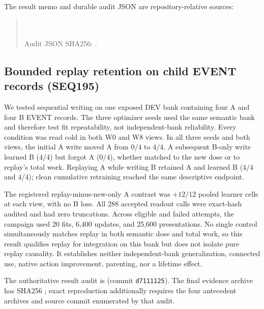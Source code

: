 \documentclass{article}
\begin{document}
The result memo and durable audit JSON are repository-relative sources:
\begin{quote}\small
{}\\
\\
Audit JSON SHA256:
.
\end{quote}

\subsection{Bounded replay retention on child EVENT records (SEQ195)}

We tested sequential writing on one exposed DEV bank containing four A and
four B EVENT records. The three optimizer seeds used the same semantic bank
and therefore test fit repeatability, not independent-bank reliability. Every
condition was read cold in both W0 and W8 views. In all three seeds and both
views, the initial A write moved A from $0/4$ to $4/4$. A subsequent B-only
write learned B ($4/4$) but forgot A ($0/4$), whether matched to the new dose
or to replay's total work. Replaying A while writing B retained A and learned
B ($4/4$ and $4/4$); clean cumulative retraining reached the same descriptive
endpoint.

The registered replay-minus-new-only A contrast was $+12/12$ pooled learner
cells at each view, with no B loss. All 288 accepted readout calls were
exact-hash audited and had zero truncations. Across eligible and failed
attempts, the campaign used 20 fits, 6,400 updates, and 25,600 presentations.
No single control simultaneously matches replay in both semantic dose and
total work, so this result qualifies replay for integration on this bank but
does not isolate pure replay causality. It establishes neither independent-bank
generalization, connected use, native action improvement, parenting, nor a
lifetime effect.

The authoritative result audit is
(commit \texttt{d7111125}). The final evidence archive has SHA256
;
exact reproduction additionally requires the four antecedent archives and
source commit enumerated by that audit.
\end{document}
